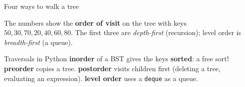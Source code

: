 \documentclass[aspectratio=169,10pt]{beamer}
\newcommand{\fA}{white}\newcommand{\fB}{white}\newcommand{\fC}{white}\newcommand{\fD}{white}
\newcommand{\fE}{white}\newcommand{\fF}{white}\newcommand{\fG}{white}
\newcommand{\bsttree}[7]{%
  \node[tn,fill=\fA] (a) at (0,0) {#1};
  \node[tn,fill=\fB] (b) at (-2,-1.15) {#2};  \node[tn,fill=\fC] (c) at (2,-1.15) {#3};
  \node[tn,fill=\fD] (d) at (-3,-2.3) {#4};   \node[tn,fill=\fE] (e) at (-1,-2.3) {#5};
  \node[tn,fill=\fF] (f) at (1,-2.3) {#6};    \node[tn,fill=\fG] (g) at (3,-2.3) {#7};
  \foreach \p/\q in {a/b,a/c,b/d,b/e,c/f,c/g}{\draw[tdInk!60] (\p) -- (\q);}}
\begin{document}
\begin{frame}{Four ways to walk a tree}
\begin{sfig}[0.66]
\end{sfig}
\vspace{1mm}
{\footnotesize The numbers show the \textbf{order of visit} on the tree with keys $50,30,70,20,40,60,80$. The first three are \emph{depth-first} (recursion); level order is \emph{breadth-first} (a queue).}
\end{frame}

\begin{frame}[allowframebreaks]{Traversals in Python}
\framebreak
{}
\vspace{2mm}
\vspace{2mm}
{\small
\textbf{inorder} of a BST gives the keys \textbf{sorted}: a free sort! \textbf{preorder} copies a tree. \textbf{postorder} visits children first (deleting a tree, evaluating an expression). \textbf{level order} uses a \texttt{deque} as a queue.}
\end{frame}
\end{document}
